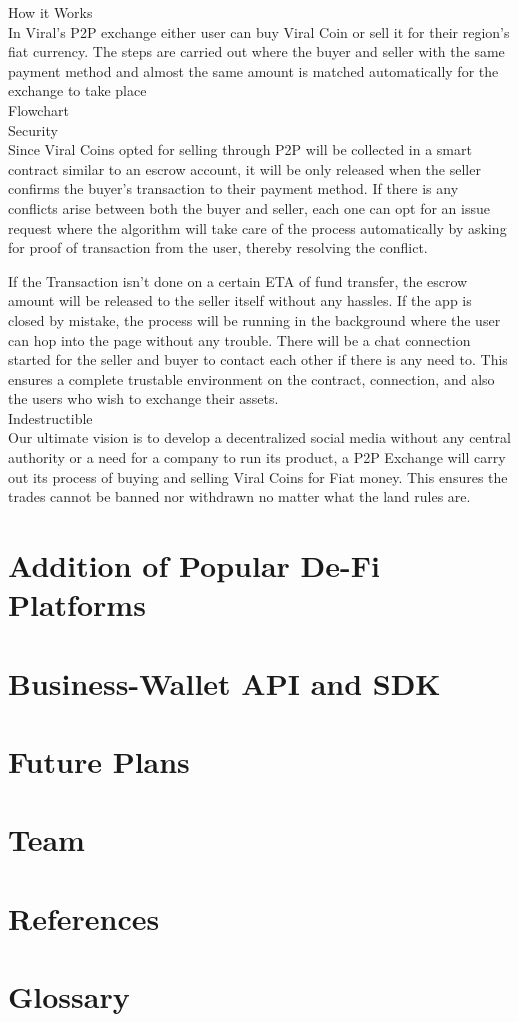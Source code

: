 \documentclass[10pt]{article}
\begin{document}
How it Works\\

In Viral's P2P exchange either user can buy Viral Coin or sell it for their region’s fiat currency. The steps are carried out where the buyer and seller with the same payment method and almost the same amount is matched automatically for the exchange to take place\\

Flowchart\\

Security\\

Since Viral Coins opted for selling through P2P will be collected in a smart contract similar to an escrow account, it will be only released when the seller confirms the buyer’s transaction to their payment method. If there is any conflicts arise between both the buyer and seller, each one can opt for an issue request where the algorithm will take care of the process automatically by asking for proof of transaction from the user, thereby resolving the conflict.

If the Transaction isn’t done on a certain ETA of fund transfer, the escrow amount will be released to the seller itself without any hassles. If the app is closed by mistake, the process will be running in the background where the user can hop into the page without any trouble. There will be a chat connection started for the seller and buyer to contact each other if there is any need to. This ensures a complete trustable environment on the contract, connection, and also the users who wish to exchange their assets.
\\
Indestructible\\

Our ultimate vision is to develop a decentralized social media without any central authority or a need for a company to run its product, a P2P Exchange will carry out its process of buying and selling Viral Coins for Fiat money. This ensures the trades cannot be banned nor withdrawn no matter what the land rules are.\\

\section{Addition of Popular De-Fi Platforms}

\section{Business-Wallet API and SDK}

\section{Future Plans}

\section{Team}

\section{References}

\section{Glossary}
\end{document}

